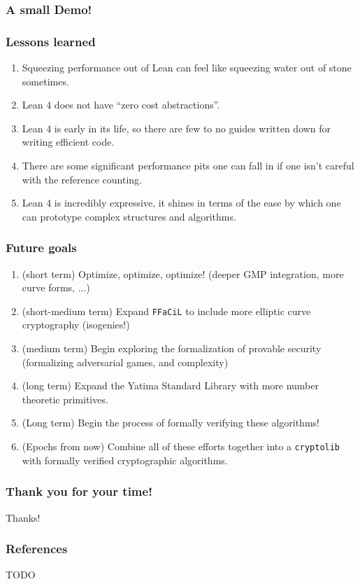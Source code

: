 \documentclass[options]{beamer}
\begin{document}
\begin{frame}
    \frametitle{A small Demo!}


\end{frame}
\begin{frame}
    \frametitle{Lessons learned}

    \begin{enumerate}
        \item Squeezing performance out of Lean can feel like squeezing water out of stone sometimes.
        \item Lean 4 does not have ``zero cost abstractions''. 
        \item Lean 4 is early in its life, so there are few to no guides written down for writing efficient code.
        \item There are some significant performance pits one can fall in if one isn't careful with the reference counting.
        \item Lean 4 is incredibly expressive, it shines in terms of the ease by which one can prototype complex structures and algorithms.
    \end{enumerate}

\end{frame}

\begin{frame}[fragile]
    \frametitle{Future goals}

    \begin{enumerate}
        \item (short term) Optimize, optimize, optimize! (deeper GMP integration, more curve forms, ...)
        \item (short-medium term) Expand \verb+FFaCiL+ to include more elliptic curve cryptography (isogenies!)
        \item (medium term) Begin exploring the formalization of provable security (formalizing adversarial games, and complexity)
        \item (long term) Expand the Yatima Standard Library with more number theoretic primitives.
        \item (Long term) Begin the process of formally verifying these algorithms!
        \item (Epochs from now) Combine all of these efforts together into a \verb+cryptolib+ with formally verified cryptographic algorithms.
    \end{enumerate}

\end{frame}

\begin{frame}
    \frametitle{Thank you for your time!}

    Thanks!

\end{frame}

\begin{frame}
    \frametitle{References}

    TODO

\end{frame}
\end{document}
